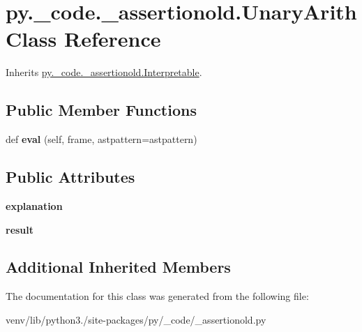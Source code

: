 \hypertarget{classpy_1_1__code_1_1__assertionold_1_1_unary_arith}{}\section{py.\+\_\+code.\+\_\+assertionold.\+Unary\+Arith Class Reference}
\label{classpy_1_1__code_1_1__assertionold_1_1_unary_arith}


Inherits \hyperlink{classpy_1_1__code_1_1__assertionold_1_1_interpretable}{py.\+\_\+code.\+\_\+assertionold.\+Interpretable}.

\subsection*{Public Member Functions}
\begin{DoxyCompactItemize}
\item 
\mbox{\label{classpy_1_1__code_1_1__assertionold_1_1_unary_arith_aa081791c6b19bca962c4be1486b1d8f9}} 
def {\bfseries eval} (self, frame, astpattern=astpattern)
\end{DoxyCompactItemize}
\subsection*{Public Attributes}
\begin{DoxyCompactItemize}
\item 
\mbox{\label{classpy_1_1__code_1_1__assertionold_1_1_unary_arith_a960b05b8c59b1d4b2cd71191c70ec6b4}} 
{\bfseries explanation}
\item 
\mbox{\label{classpy_1_1__code_1_1__assertionold_1_1_unary_arith_a258ec16c0e4d7263aa1f8471ac905f7a}} 
{\bfseries result}
\end{DoxyCompactItemize}
\subsection*{Additional Inherited Members}


The documentation for this class was generated from the following file\+:\begin{DoxyCompactItemize}
\item 
venv/lib/python3./site-\/packages/py/\+\_\+code/\+\_\+assertionold.\+py\end{DoxyCompactItemize}
